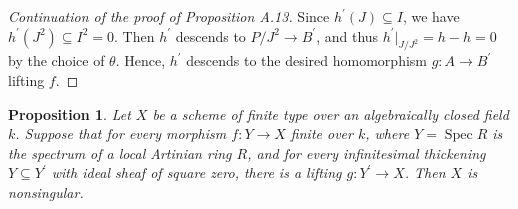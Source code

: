 \documentclass{article}
\newtheorem{proposition}[theorem]{Proposition}
\theoremstyle{definition}
\newcommand{\Spec}{\operatorname{Spec}}
\begin{document}
\begin{proof}[Continuation of the proof of Proposition A.13]
Since \(h^{\prime}(J)\subseteq I\), we have \(h^{\prime}(J^{2})\subseteq I^{2} = 0\). Then \(h^{\prime}\) descends to \(P / J^{2}\to B^{\prime}\), and thus \(h^{\prime}|_{J / J^{2}} = h - h = 0\) by the choice of \(\theta\). Hence, \(h^{\prime}\) descends to the desired homomorphism \(g:A\to B^{\prime}\) lifting \(f\).
\end{proof}

\begin{proposition}
Let \(X\) be a scheme of finite type over an algebraically closed field \(k\). Suppose that for every morphism \(f:Y\to X\) finite over \(k\), where \(Y = \Spec R\) is the spectrum of a local Artinian ring \(R\), and for every infinitesimal thickening \(Y\subseteq Y^{\prime}\) with ideal sheaf of square zero, there is a lifting \(g:Y^{\prime}\to X\). Then \(X\) is nonsingular.
\end{proposition}
\end{document}
